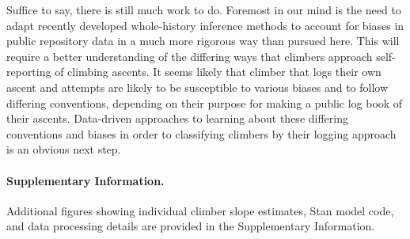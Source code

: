 \documentclass[12pt]{article}
\begin{document}
Suffice to say, there is still much work to do. Foremost in our mind is the need to adapt recently developed whole-history inference methods to account for biases in public repository data in a much more rigorous way than pursued here. This will require a better understanding of the differing ways that climbers approach self-reporting of climbing ascents. It seems likely that climber that logs their own ascent and attempts are likely to be susceptible to various biases and to follow differing conventions, depending on their purpose for making a public log book of their ascents. Data-driven approaches to learning about these differing conventions and biases in order to classifying climbers by their logging approach is an obvious next step.


\printglossaries

\paragraph{Supplementary Information.} Additional figures showing individual climber slope estimates, Stan model code, and data processing details are provided in the Supplementary Information.



\end{document}
